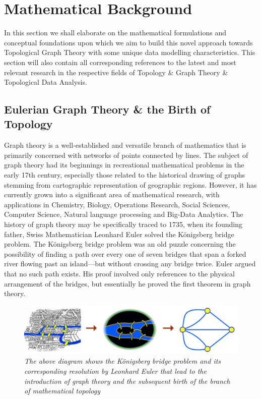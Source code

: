 \section{Mathematical Background}

In this section we shall elaborate on the mathematical formulations and conceptual foundations upon which we aim to build this novel approach towards Topological Graph Theory with some unique data modelling characteristics. This section will also contain all corresponding references to the latest and most relevant research in the respective fields of Topology \& Graph Theory \& Topological Data Analysis. 

\subsection{Eulerian Graph Theory \& the Birth of Topology}


Graph theory is a well-established and versatile branch of mathematics that is primarily concerned with networks of points connected by lines. The subject of graph theory had its beginnings in recreational mathematical problems in the early 17th century, especially those related to the historical drawing of graphs stemming from cartographic representation of geographic regions. \cite{01.10_2001HistoryofGT} However, it has currently grown into a significant area of mathematical research, with applications in Chemistry, Biology, Operations Research, Social Sciences, Computer Science, Natural language processing \cite{22.0_2015_NLPGraphs} and Big-Data Analytics.\cite{22.1_BigDataPredictionGT} \cite{22.2_GTapplicationBigData} The history of graph theory may be specifically traced to 1735, when its founding father, Swiss Mathematician Leonhard Euler solved the Königsberg bridge problem. \cite{01.13_GTBackground}The Königsberg bridge problem was an old puzzle concerning the possibility of finding a path over every one of seven bridges that span a forked river flowing past an island—but without crossing any bridge twice. Euler argued that no such path exists. His proof involved only references to the physical arrangement of the bridges, but essentially he proved the first theorem in graph theory.\cite{01.11_1999historyofTopo}

\begin{figure}
   \centering
	\includegraphics[width=\linewidth]{images/01_Seven bridges of Konigsberg.jpg}
	\caption{\textit{The above diagram shows the Königsberg bridge problem and its corresponding resolution by Leonhard Euler that lead to the introduction of graph theory and the subsequent birth of the branch of mathematical topology}}
	\label{fig:Seven bridges of Konigsberg}
\end{figure}

